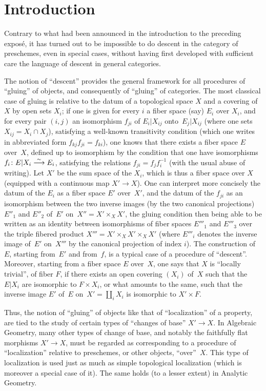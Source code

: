 \label{VI}
\section{Introduction}

Contrary to what had been announced in
the introduction to the preceding expos\'e, it has
turned out to be impossible to do descent in the category
of preschemes, even in special cases, without having
first developed with sufficient care the language of
descent in general categories.

The notion of ``descent'' provides the general framework for all
procedures of ``gluing'' of objects, and
consequently of ``gluing'' of categories. The most
classical case of gluing is relative to the datum of a
topological space $X$ and a covering of~$X$ by open sets $X_i$; if
one is given for every $i$ a fiber space (say) $E_i$ over
$X_i$, and for every pair $(i,j)$ an isomorphism $f_{ji}$ of
$E_i|X_{ij}$ onto~$E_j|X_{ij}$ (where one sets $X_{ij}=X_i\cap X_j$),
satisfying a well-known transitivity condition (which one
writes in abbreviated form $f_{kj}f_{ji}=f_{ki}$), one
knows that there exists a fiber space $E$ over~$X$, defined up to
isomorphism by the condition that one have isomorphisms
$f_i\colon E|X_i\overset{\sim}{\longrightarrow} E_i$, satisfying the relations
$f_{ji}=f_jf_i^{-1}$ (with the usual abuse of writing). Let $X'$
be the sum space of the $X_i$, which is thus a fiber space over
$X$ (\ie equipped with a continuous map $X'\to X$). One can
interpret more concisely the datum of the $E_i$
as a fiber space $E'$ over~$X'$, and the datum of the $f_{ji}$
as an isomorphism between the two inverse images (by the two
canonical projections) $E''_1$ and $E''_2$ of~$E'$ on~$X''=X'\times_X
X'$, the gluing condition then being able to be written as an
identity between isomorphisms of fiber spaces $E'''_1$ and
$E'''_3$ over the triple fibered product $X'''=X'\times_X X'\times_X
X'$ (where $E'''_i$ denotes the inverse image of~$E'$ on~$X'''$
by the canonical projection of index $i$). The construction of~$E$,
starting from~$E'$ and from~$f$, is a typical case
of a procedure of ``descent''. Moreover, starting from a fiber
space $E$ over~$X$, one says that $X$ is ``locally trivial'', of
fiber $F$, if there exists an open covering $(X_i)$ of~$X$ such that
the $E|X_i$ are isomorphic to $F\times X_i$, or what amounts
to the same, such that the inverse image $E'$ of~$E$ on~$X'=\coprod_i
X_i$ is isomorphic to $X'\times F$.

Thus, the notion of ``gluing'' of objects like that of
``localization'' of a property, are tied to
the study of certain types of ``changes of base'' $X'\to X$.
In Algebraic Geometry, many other types of change
of base, and notably the faithfully flat morphisms $X'\to X$,
must be regarded as corresponding to a
procedure of ``localization'' relative to
preschemes, or other objects, ``over''~$X$. This type of
localization is used just as much as simple
topological localization (which is moreover a special case of it). The same holds
(to a lesser extent) in Analytic Geometry.

